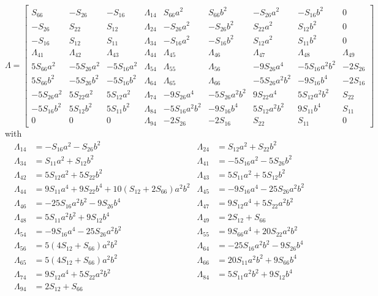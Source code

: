 \documentclass[11pt,a4paper]{article}
\begin{document}
\begin{equation}
\Lambda = \left[
\begin{matrix}
 S_{66} & -S_{26} & -S_{16} & \Lambda_{14} & S_{66} a^2 & S_{66} b^2 & -S_{26} a^2 & -S_{16} b^2 & 0 \\
-S_{26} & S_{22} & S_{12} & \Lambda_{24}  & - S_{26} a^2 & -S_{26} b^2 & S_{22} a^2 & S_{12} b^2 & 0 \\
-S_{16} & S_{12} & S_{11} & \Lambda_{34} & - S_{16} a^2 & -S_{16} b^2 & S_{12} a^2 & S_{11} b^2 & 0 \\
 \Lambda_{41} & \Lambda_{42} & \Lambda_{43} & \Lambda_{44} & \Lambda_{45} & \Lambda_{46} & \Lambda_{47} & \Lambda_{48} & \Lambda_{49} \\
5 S_{66} a^2 & -5 S_{26} a^2 & -5 S_{16} a^2 & \Lambda_{54} & \Lambda_{55} & \Lambda_{56} & -9 S_{26} a^4 & -5 S_{16} a^2 b^2 & - 2 S_{26} \\
5 S_{66} b^2 & -5 S_{26} b^2 & -5 S_{16} b^2 & \Lambda_{64} & \Lambda_{65} & \Lambda_{66} & -5 S_{26} a^2 b^2 & -9 S_{16} b^4 & - 2 S_{16} \\
-5 S_{26} a^2 & 5 S_{22} a^2 & 5 S_{12} a^2 & \Lambda_{74} & -9 S_{26} a^4 & -5 S_{26} a^2 b^2 & 9 S_{22} a^4 & 5 S_{12} a^2 b^2 & S_{22} \\
-5 S_{16} b^2 & 5 S_{12} b^2 & 5 S_{11} b^2 & \Lambda_{84} & -5 S_{16} a^2 b^2 & -9 S_{16} b^4 & 5 S_{12} a^2 b^2 & 9 S_{11} b^4 & S_{11} \\
0 & 0 & 0 & \Lambda_{94} & -2 S_{26} & -2 S_{16} & S_{22} & S_{11} & 0
\end{matrix}
\right]
\end{equation}
with
\begin{align}
\Lambda_{14} &= -S_{16} a^2 -S_{26}b^2 & \Lambda_{24} &= S_{12}a^2 + S_{22}b^2 \nonumber  \\
\Lambda_{34} &= S_{11}a^2 + S_{12}b^2 & \Lambda_{41} &= -5 S_{16}a^2 - 5 S_{26}b^2 \nonumber  \\
\Lambda_{42} &= 5 S_{12}a^2 + 5 S_{22}b^2 & \Lambda_{43} &= 5 S_{11}a^2 + 5 S_{12}b^2 \nonumber \\
\Lambda_{44} &= 9 S_{11} a^4 + 9 S_{22} b^4 + 10 (S_{12}+2 S_{66})a^2 b^2 & 
\Lambda_{45} &= -9 S_{16} a^4 -25 S_{26} a^2 b^2 \nonumber  \\
\Lambda_{46} &= -25 S_{16}a^2b^2 -9 S_{26} b^4 & \Lambda_{47} &= 9 S_{12} a^4 + 5 S_{22} a^2 b^2 \nonumber \\
\Lambda_{48} &= 5 S_{11} a^2 b^2 + 9 S_{12} b^4 & \Lambda_{49} &= 2 S_{12} + S_{66} \nonumber \\
\Lambda_{54} &= -9 S_{16} a^4 -25 S_{26} a^2 b^2 & \Lambda_{55} &= 9 S_{66} a^4 + 20 S_{22} a^2 b^2 \nonumber \\
\Lambda_{56} &= 5(4 S_{12} + S_{66} ) a^2 b^2 & \Lambda_{64} &=  -25 S_{16} a^2 b^2 -9 S_{26} b^4 \nonumber  \\
\Lambda_{65} &= 5(4 S_{12} + S_{66}) a^2 b^2 & \Lambda_{66} &= 20 S_{11} a^2 b^2 + 9 S_{66} b^4 \nonumber \\
\Lambda_{74} &= 9 S_{12} a^4 + 5 S_{22} a^2 b^2 & \Lambda_{84} &= 5 S_{11} a^2 b^2 + 9 S_{12} b^4 \nonumber \\
\Lambda_{94} &=  2 S_{12} + S_{66} & & \nonumber 
\end{align}
\end{document}
